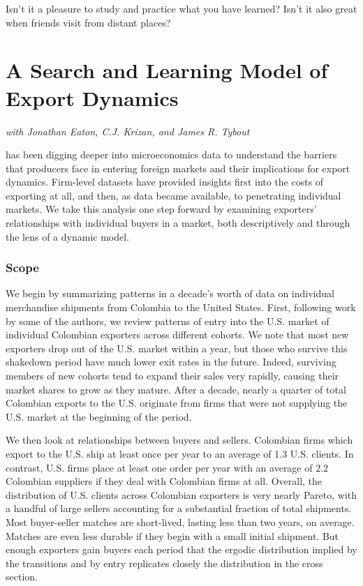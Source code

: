\begin{savequote}[75mm]
Isn't it a pleasure to study and practice what you have learned?  Isn't it also great when friends visit from distant places?
\end{savequote}

\chapter{A Search and Learning Model of Export Dynamics}
\hfill{} \emph{with Jonathan Eaton, C.J. Krizan, and James R. Tybout}

 has been digging deeper into microeconomics data to
understand the barriers that producers face in entering foreign markets and
their implications for export dynamics. Firm-level datasets have provided
insights first into the costs of exporting at all, and then, as data became
available, to penetrating individual markets. We take this analysis one step
forward by examining exporters' relationships with individual buyers in a
market, both descriptively and through the lens of a dynamic model.

\subsection{Scope}

We begin by summarizing patterns in a decade's worth of data on individual
merchandise shipments from Colombia to the United States. First, following
work by some of the authors,\citep{eaton2008nthe} we review patterns of
entry into the U.S. market of individual Colombian exporters across
different cohorts. We note that most new exporters drop out of the U.S.
market within a year, but those who survive this shakedown period have much
lower exit rates in the future. Indeed, surviving members of new cohorts
tend to expand their sales very rapidly, causing their market shares to grow
as they mature. After a decade, nearly a quarter of total Colombian exports
to the U.S. originate from firms that were not supplying the U.S. market at
the beginning of the period.

We then look at relationships between buyers and sellers. Colombian firms
which export to the U.S. ship at least once per year to an average of 1.3
U.S. clients. In contrast, U.S. firms place at least one order per year with
an average of 2.2 Colombian suppliers if they deal with Colombian firms at
all. Overall, the distribution of U.S. clients across Colombian exporters is
very nearly Pareto, with a handful of large sellers accounting for a
substantial fraction of total shipments. Most buyer-seller matches are
short-lived, lasting less than two years, on average. Matches are even less
durable if they begin with a small initial shipment. But enough exporters
gain buyers each period that the ergodic distribution implied by the
transitions and by entry replicates closely the distribution in the cross
section.

